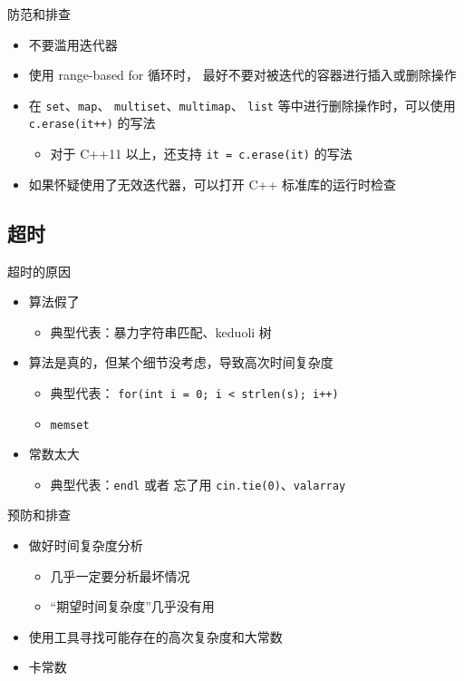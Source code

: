 \documentclass[10pt,mathserif]{beamer}
\begin{document}
\begin{frame}{防范和排查}
	\begin{itemize}
		\item 不要滥用迭代器
		\item 使用 range-based for 循环时，
			最好不要对被迭代的容器进行插入或删除操作
		\item 在 \lstinline|set|、\lstinline|map|、
			\lstinline|multiset|、\lstinline|multimap|、
			\lstinline|list| 等中进行删除操作时，可以使用
			\lstinline|c.erase(it++)| 的写法
			\begin{itemize}
				\item 对于 C++11 以上，还支持 \lstinline|it = c.erase(it)|
					的写法
			\end{itemize}
		\item 如果怀疑使用了无效迭代器，可以打开 C++ 标准库的运行时检查
	\end{itemize}
\end{frame}

\subsection{超时}
\begin{frame}{超时的原因}
	\begin{itemize}
		\item 算法假了
			\begin{itemize}
				\item<2> 典型代表：暴力字符串匹配、keduoli 树
			\end{itemize}
		\item 算法是真的，但某个细节没考虑，导致高次时间复杂度
			\begin{itemize}
				\item<2> 典型代表：
					\lstinline!for(int i = 0; i < strlen(s); i++)!
				\item<2> \lstinline!memset!
			\end{itemize}
		\item 常数太大
			\begin{itemize}
				\item<2> 典型代表：\lstinline!endl! 或者
					忘了用 \lstinline{cin.tie(0)}、\lstinline!valarray!
			\end{itemize}
	\end{itemize}
\end{frame}

\begin{frame}{预防和排查}
	\begin{itemize}
		\item 做好时间复杂度分析
			\begin{itemize}
				\item 几乎一定要分析最坏情况
				\item “期望时间复杂度”几乎没有用
			\end{itemize}
		\item 使用工具寻找可能存在的高次复杂度和大常数
		\item 卡常数
	\end{itemize}
\end{frame}
\end{document}
